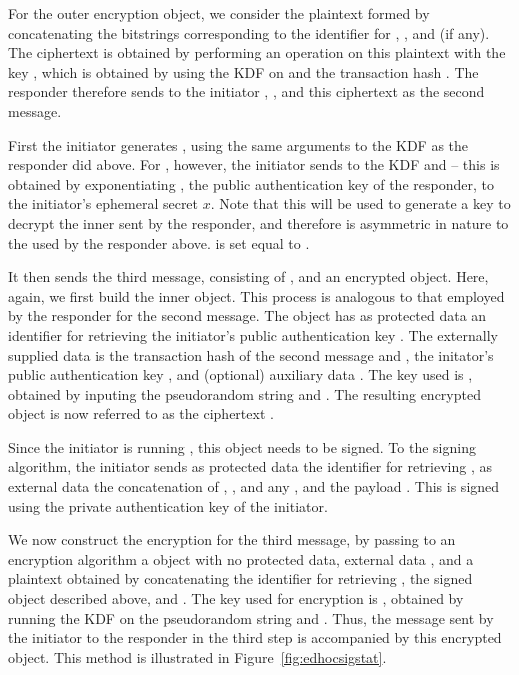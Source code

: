 For the outer encryption object, we consider the plaintext formed by concatenating the bitstrings corresponding to the identifier for \mCredr, \mMactwo, and \mADtwo (if any). The ciphertext is obtained by performing an \mXor operation on this plaintext with the key \mKtwoe, which is obtained by using the KDF on \mPRKtwo and the transaction hash \mTHtwo. The responder therefore sends to the initiator \mGy, \mCr, and this ciphertext as the second message.

First the initiator generates \mPRKtwo, using the same arguments to the KDF as the responder did above. For \mPRKthree, however, the initiator sends to the KDF \mPRKtwo and \mGrx -- this \mGrx is obtained by exponentiating \mCredr, the public authentication key of the responder, to the initiator's ephemeral secret $x$. Note that this will be used to generate a key to decrypt the inner \mMactwo sent by the responder, and therefore is asymmetric in nature to the \mGrx used by the responder above. \mPRKfour is set equal to \mPRKthree. 

It then sends the third message, consisting of \mCr, and an encrypted object. Here, again, we first build the inner \mCose object. This process is analogous to that employed by the responder for the second message. The \mCose object has as protected data an identifier for retrieving the initiator's public authentication key \mCredi. The externally supplied data is the transaction hash \mTHthree of the second message and \mTHtwo,  the initator's public authentication key \mCredi, and (optional) auxiliary data \mADthree. The key used is \mKthreem, obtained by inputing the pseudorandom string \mPRKthree and \mTHthree. The resulting encrypted object is now referred to as the ciphertext \mMacthree. 

Since the initiator is running \mSig, this \mCose object needs to be signed. To the signing algorithm, the initiator sends as protected data the identifier for retrieving \mCredi, as external data the concatenation of \mTHthree, \mCredi, and any \mADthree, and the payload \mMacthree. This is signed using the private authentication key of the initiator.  

We now construct the encryption for the third message, by passing to an \mAead encryption algorithm a \mCose object with no protected data, external data \mTHthree, and a plaintext obtained by concatenating the identifier for retrieving \mCredi, the signed object described above, and \mADthree. The key used for encryption is \mKthreeae, obtained by running the KDF on the pseudorandom string \mPRKthree and \mTHtwo. Thus, the message sent by the initiator to the responder in the third step is \mCr accompanied by this encrypted object. This method is illustrated in Figure~\ref{fig:edhocsigstat}.

